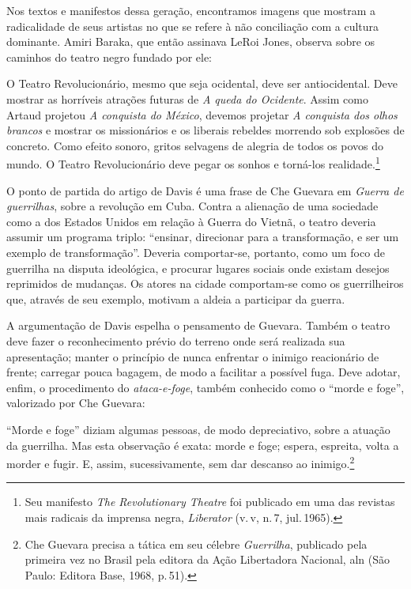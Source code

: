 Nos textos e manifestos dessa geração, encontramos imagens que mostram a
radicalidade de seus artistas no que se refere à não conciliação com a
cultura dominante. Amiri Baraka, que então assinava LeRoi Jones, observa
sobre os caminhos do teatro negro fundado por ele:

\startblockquote
O Teatro Revolucionário, mesmo que seja ocidental, deve ser
antiocidental. Deve mostrar as horríveis atrações futuras de {\it A
queda do Ocidente}. Assim como Artaud projetou {\it A conquista do
México}, devemos projetar {\it A conquista dos olhos brancos} e mostrar
os missionários e os liberais rebeldes morrendo sob explosões de
concreto. Como efeito sonoro, gritos selvagens de alegria de todos os
povos do mundo. O Teatro Revolucionário deve pegar os sonhos e torná-los
realidade.\footnote{Seu manifesto {\it The Revolutionary Theatre} foi
  publicado em uma das revistas mais radicais da imprensa negra,
  {\it Liberator} (v.\,{\sc v}, n.\,7, jul.\,1965).}
\stopblockquote


O ponto de partida do artigo de Davis é uma frase de Che Guevara em
{\it Guerra de guerrilhas}, sobre a revolução em Cuba. Contra a
alienação de uma sociedade como a dos Estados Unidos em relação à Guerra
do Vietnã, o teatro deveria assumir um programa triplo: “ensinar,
direcionar para a transformação, e ser um exemplo de transformação”.
Deveria comportar-se, portanto, como um foco de guerrilha na disputa
ideológica, e procurar lugares sociais onde existam desejos reprimidos
de mudanças. Os atores na cidade comportam-se como os guerrilheiros que,
através de seu exemplo, motivam a aldeia a participar da guerra.

A argumentação de Davis espelha o pensamento de Guevara. Também o teatro
deve fazer o reconhecimento prévio do terreno onde será realizada sua
apresentação; manter o princípio de nunca enfrentar o inimigo
reacionário de frente; carregar pouca bagagem, de modo a facilitar a
possível fuga. Deve adotar, enfim, o procedimento do {\it ataca-e-foge},
também conhecido como o “morde e foge”, valorizado por Che Guevara:

\startblockquote
“Morde e foge” diziam algumas pessoas, de modo depreciativo, sobre a
atuação da guerrilha. Mas esta observação é exata: morde e foge; espera,
espreita, volta a morder e fugir. E, assim, sucessivamente, sem dar
descanso ao inimigo.\footnote{Che Guevara precisa a tática em seu
  célebre {\it Guerrilha}, publicado pela primeira vez no Brasil pela
  editora da Ação Libertadora Nacional, {\sc aln} (São Paulo:
  Editora Base, 1968, p.\,51).}
\stopblockquote

